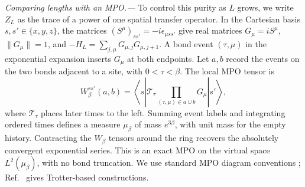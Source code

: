 \documentclass[aps,prl,reprint,amsmath,amssymb,nofootinbib,raggedbottom]{revtex4-2}
\begin{document}
\emph{Comparing lengths with an MPO.---}
To control this purity as $L$ grows, we write $Z_L$ as the trace of a
power of one spatial transfer operator. In the Cartesian
basis $s,s'\in\{x,y,z\}$, the matrices
$(S^\mu)_{ss'}=-i\epsilon_{\mu ss'}$ give real matrices $G_\mu=iS^\mu$,
$\|G_\mu\|=1$, and $-H_L=\sum_{j,\mu}G_{\mu,j}G_{\mu,j+1}$.
A bond event $(\tau,\mu)$ in the exponential expansion inserts $G_\mu$
at both endpoints. Let $a,b$ record the events on the two bonds adjacent
to a site, with $0<\tau<\beta$. The local MPO tensor is
\begin{equation}
 W_\beta^{ss'}(a,b)=
 \left\langle s\left|\mathcal T_\tau
 \prod_{(\tau,\mu)\in a\cup b}G_\mu\right|s'\right\rangle,
 \label{eq:local}
\end{equation}
where $\mathcal T_\tau$ places later times to the left. Summing event
labels and integrating ordered times defines a measure $\mu_\beta$ of
mass $e^{3\beta}$, with unit mass for the empty history. Contracting the
$W_\beta$ tensors around the ring recovers the absolutely convergent
exponential series. This is an exact MPO on the virtual space
$L^2(\mu_\beta)$, with no bond truncation. We use standard MPO diagram
conventions \cite{tang,pirvu}; Ref.~\cite{pirvu} gives Trotter-based
constructions.
\end{document}
